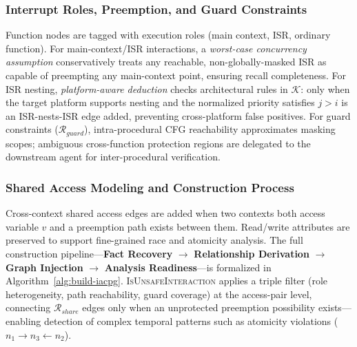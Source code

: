 \documentclass[a4paper,UKenglish,cleveref, autoref, thm-restate]{lipics-v2021}
\begin{document}
\subsubsection{Interrupt Roles, Preemption, and Guard Constraints}

Function nodes are tagged with execution roles (main context, ISR, ordinary function). For main-context/ISR interactions, a \textit{worst-case concurrency assumption} conservatively treats any reachable, non-globally-masked ISR as capable of preempting any main-context point, ensuring recall completeness. For ISR nesting, \textit{platform-aware deduction} checks architectural rules in $\mathcal{K}$: only when the target platform supports nesting and the normalized priority satisfies $j > i$ is an ISR-nests-ISR edge added, preventing cross-platform false positives. For guard constraints ($\mathcal{R}_{guard}$), intra-procedural CFG reachability approximates masking scopes; ambiguous cross-function protection regions are delegated to the downstream agent for inter-procedural verification.

\subsubsection{Shared Access Modeling and Construction Process}

Cross-context shared access edges are added when two contexts both access variable $v$ and a preemption path exists between them. Read/write attributes are preserved to support fine-grained race and atomicity analysis. The full construction pipeline---\textbf{Fact Recovery} $\to$ \textbf{Relationship Derivation} $\to$ \textbf{Graph Injection} $\to$ \textbf{Analysis Readiness}---is formalized in Algorithm~\ref{alg:build-iacpg}. \textsc{IsUnsafeInteraction} applies a triple filter (role heterogeneity, path reachability, guard coverage) at the access-pair level, connecting $\mathcal{R}_{share}$ edges only when an unprotected preemption possibility exists---enabling detection of complex temporal patterns such as atomicity violations ($n_1 \to n_3 \gets n_2$).
\end{document}
